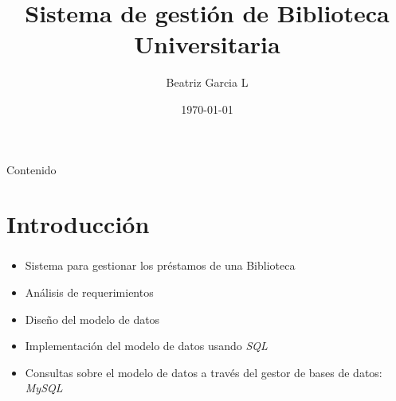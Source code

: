 \documentclass{beamer}
\title{Sistema de gestión de Biblioteca Universitaria}
\author{Beatriz Garcia L}
\date{\today}
\begin{document}
\begin{frame}
\titlepage
\end{frame}

\begin{frame}{Contenido}
\tableofcontents
\end{frame}

\section{Introducción}
\begin{frame}
    \frametitle{\secname}
    \begin{itemize}
        \item Sistema para gestionar los préstamos de una Biblioteca
        \item Análisis de requerimientos
        \item Diseño del modelo de datos
        \item Implementación del modelo de datos usando \textit{SQL}
        \item Consultas sobre el modelo de datos a través del gestor de bases de datos: \textit{MySQL}
    \end{itemize}
\end{frame}
\end{document}
